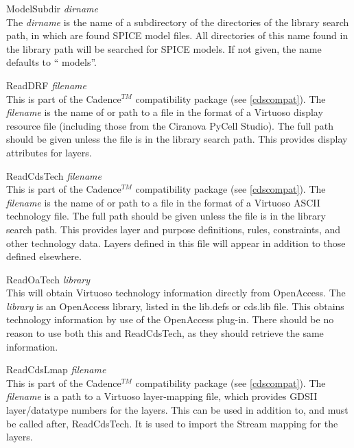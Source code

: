 \begin{description}
\item{\vt ModelSubdir} {\it dirname}\\
The {\it dirname} is the name of a subdirectory of the directories of
the library search path, in which are found SPICE model files.  All
directories of this name found in the library path will be searched
for SPICE models.  If not given, the name defaults to ``{\vt
models}''.

\item{\vt ReadDRF} {\it filename}\\
This is part of the Cadence$^{TM}$ compatibility package (see
\ref{cdscompat}).  The {\it filename} is the name of or path to a file
in the format of a Virtuoso display resource file (including those
from the Ciranova PyCell Studio).  The full path should be given
unless the file is in the library search path.  This provides display
attributes for layers.

\item{\vt ReadCdsTech} {\it filename}\\
This is part of the Cadence$^{TM}$ compatibility package (see
\ref{cdscompat}).  The {\it filename} is the name of or path to a file
in the format of a Virtuoso ASCII technology file.  The full path
should be given unless the file is in the library search path.  This
provides layer and purpose definitions, rules, constraints, and other
technology data.  Layers defined in this file will appear in addition
to those defined elsewhere.

\item{\vt ReadOaTech} {\it library}\\
This will obtain Virtuoso technology information directly from
OpenAccess.  The {\it library} is an OpenAccess library, listed in
the {\vt lib.defs} or {\vt cds.lib} file.  This obtains technology
information by use of the OpenAccess plug-in.  There should be no
reason to use both this and {\vt ReadCdsTech}, as they should
retrieve the same information.

\item{\vt ReadCdsLmap} {\it filename}\\
This is part of the Cadence$^{TM}$ compatibility package (see
\ref{cdscompat}).  The {\it filename} is a path to a Virtuoso
layer-mapping file, which provides GDSII layer/datatype numbers for
the layers.  This can be used in addition to, and must be called
after, {\vt ReadCdsTech}.  It is used to import the Stream mapping
for the layers.


\end{description}
